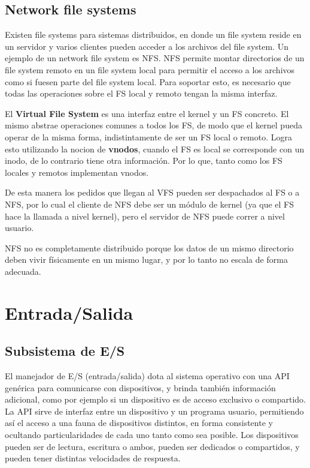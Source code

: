 \documentclass{article}
\begin{document}
\subsection{Network file systems}

Existen file systems para sistemas distribuidos, en donde un file system reside en un servidor y varios clientes pueden acceder a los archivos del file system. Un ejemplo de un network file system es NFS. NFS permite montar directorios de un file system remoto en un file system local para permitir el acceso a los archivos como si fuesen parte del file system local. Para soportar esto, es necesario que todas las operaciones sobre el FS local y remoto tengan la misma interfaz.

El \textbf{Virtual File System} es una interfaz entre el kernel y un FS concreto. El mismo abstrae operaciones comunes a todos los FS, de modo que el kernel pueda operar de la misma forma, indistintamente de ser un FS local o remoto. Logra esto utilizando la nocion de \textbf{vnodos}, cuando el FS es local se corresponde con un inodo, de lo contrario tiene otra información. Por lo que, tanto como los FS locales y remotos implementan vnodos.

De esta manera los pedidos que llegan al VFS pueden ser despachados al FS o a NFS, por lo cual el cliente de NFS debe ser un módulo de kernel (ya que el FS hace la llamada a nivel kernel), pero el servidor de NFS puede correr a nivel usuario.

NFS no es completamente distribuido porque los datos de un mismo directorio deben vivir físicamente en un mismo lugar, y por lo tanto no escala de forma adecuada.

\section{Entrada/Salida}

\subsection{Subsistema de E/S}

El manejador de E/S (entrada/salida) dota al sistema operativo con una API genérica para comunicarse con dispositivos, y brinda también información adicional, como por ejemplo si un dispositivo es de acceso exclusivo o compartido. La API sirve de interfaz entre un dispositivo y un programa usuario, permitiendo así el acceso a una fauna de dispositivos distintos, en forma consistente y ocultando particularidades de cada uno tanto como sea posible. Los dispositivos pueden ser de lectura, escritura o ambos, pueden ser dedicados o compartidos, y pueden tener distintas velocidades de respuesta.
\end{document}
